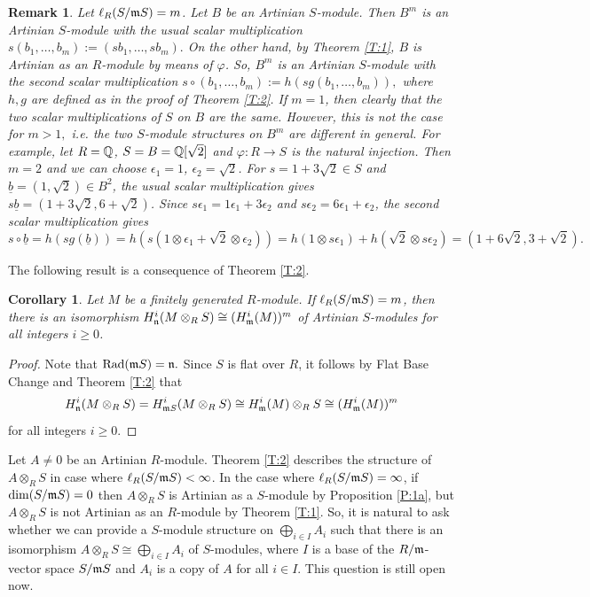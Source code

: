 \documentclass[a4papersize]{article}
\newtheorem{corollary}[theorem]{Corollary}
\newtheorem{remark}[theorem]{Remark}
\DeclareMathOperator{\Rad}{Rad}
\begin{document}
\begin{remark} \label{R:1a} {\rm Let  $\ell_R(S/\frak mS)=m$. Let $B$ be an Artinian $S$-module. Then $B^m$ is an Artinian $S$-module with the usual scalar multiplication $s(b_1, \ldots , b_m):=(sb_1, \ldots , sb_m).$  On the other hand, by Theorem \ref{T:1},  $B$ is Artinian as an $R$-module by means of $\varphi$. So, $B^m$ is an Artinian $S$-module with the second scalar multiplication $s\circ (b_1, \ldots , b_m):=h(sg(b_1, \ldots , b_m)),$ where $h, g$ are defined as in the proof of Theorem \ref{T:2}. If $m=1$, then clearly that the two scalar multiplications of $S$ on $B$ are the same. However, this is not the case for $m>1,$ i.e. the two $S$-module structures  on $B^m$ are different in general. For example, let $R=\Bbb Q$, $S=B=\Bbb Q[\sqrt 2]$ and $\varphi: R\rightarrow S$ is the natural injection. Then $m=2$ and we can choose $\epsilon_1=1$, $\epsilon_2=\sqrt 2$. For $s=1+3\sqrt 2\in S$ and $\underline b=(1, \sqrt 2)\in B^2$, the usual scalar multiplication gives $s\underline b= (1+3\sqrt 2, 6+\sqrt 2)$. Since $s\epsilon_1=1\epsilon_1+3\epsilon_2$ and $s\epsilon_2=6\epsilon_1+\epsilon_2$, the second scalar multiplication gives 
$$s\circ\underline b=h(sg(\underline b))=h(s(1\otimes\epsilon_1+\sqrt 2\otimes\epsilon_2))=h(1\otimes s\epsilon_1)+h(\sqrt 2\otimes s\epsilon_2)=(1+6\sqrt 2,3+\sqrt 2).$$}
\end{remark}

 The following result is a consequence of Theorem \ref{T:2}.
\begin{corollary}\label{C:3}  Let $M$ be a finitely generated $R$-module. If $\ell_R (S/\frak mS)=m$, then there is an isomorphism  $H^i_{\frak n}(M\otimes_RS)\cong (H^i_{\frak m}(M))^m$ of Artinian $S$-modules for all integers $i\geq 0$. 
\end{corollary}

\begin{proof} Note that $\Rad (\frak mS)=\frak n.$ Since $S$ is flat over $R$, it follows by Flat Base Change \cite[Theorem 4.3.2]{BS} and Theorem \ref{T:2} that 
$$H^i_{\frak n}(M\otimes_RS)= H^i_{\frak mS}(M\otimes_RS)\cong H^i_{\frak m}(M)\otimes_RS\cong (H^i_{\frak m}(M))^m$$ for all integers $i\geq 0$.
\end{proof}

Let $A\neq 0$ be an Artinian $R$-module.  Theorem \ref{T:2} describes the structure of $A\otimes_RS$ in case where $\ell_R(S/\frak mS)<\infty$. In the case where $\ell_R(S/\frak mS)=\infty$, if $\dim (S/\frak mS)=0$ then $A\otimes_RS$ is Artinian as a $S$-module by Proposition \ref{P:1a}, but $A\otimes_RS$ is not Artinian as an $R$-module by Theorem \ref{T:1}. So, it is natural to ask whether we can provide a $S$-module structure on $\bigoplus_{i\in I}A_i$ such that there is an isomorphism $A\otimes_RS\cong \bigoplus_{i\in I}A_i$ of $S$-modules,  where $I$ is a base of the $R/\frak m$-vector space $S/\frak mS$ and $A_i$ is a copy of $A$ for all $i\in I$. This question is still open now.
\end{document}
